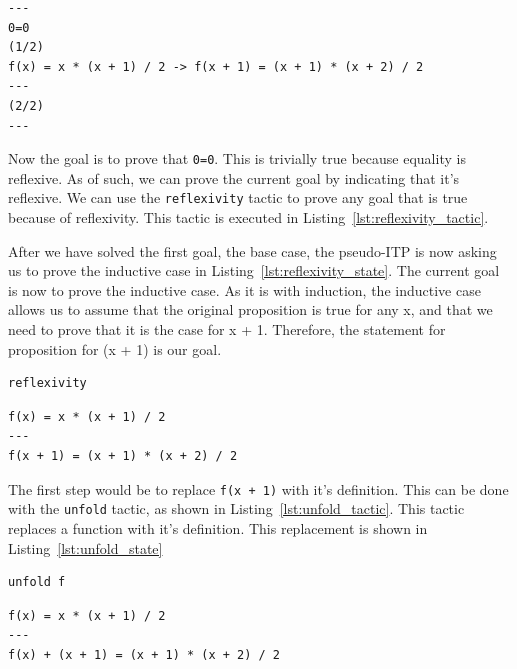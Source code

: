 \documentclass[
]{article}
\newcommand{\passthrough}[1]{#1}
\begin{document}
\begin{lstlisting}[caption={State after running the simplify tactic}, label=lst:simplify_state]
---
0=0
(1/2)
f(x) = x * (x + 1) / 2 -> f(x + 1) = (x + 1) * (x + 2) / 2
---
(2/2)
---
\end{lstlisting}

Now the goal is to prove that \passthrough{\lstinline!0=0!}. This is
trivially true because equality is reflexive. As of such, we can prove
the current goal by indicating that it's reflexive. We can use the
\passthrough{\lstinline!reflexivity!} tactic to prove any goal that is
true because of reflexivity. This tactic is executed in
Listing~\ref{lst:reflexivity_tactic}.

After we have solved the first goal, the base case, the pseudo-ITP is
now asking us to prove the inductive case in
Listing~\ref{lst:reflexivity_state}. The current goal is now to prove
the inductive case. As it is with induction, the inductive case allows
us to assume that the original proposition is true for any x, and that
we need to prove that it is the case for x + 1. Therefore, the statement
for proposition for (x + 1) is our goal.

\begin{lstlisting}[caption={Running the reflexivity tactic}, label=lst:reflexivity_tactic]
reflexivity
\end{lstlisting}

\begin{lstlisting}[caption={State after running the reflexivity tactic}, label=lst:reflexivity_state]
f(x) = x * (x + 1) / 2
---
f(x + 1) = (x + 1) * (x + 2) / 2
\end{lstlisting}

The first step would be to replace \passthrough{\lstinline!f(x + 1)!}
with it's definition. This can be done with the
\passthrough{\lstinline!unfold!} tactic, as shown in
Listing~\ref{lst:unfold_tactic}. This tactic replaces a function with
it's definition. This replacement is shown in
Listing~\ref{lst:unfold_state}

\begin{lstlisting}[caption={Running the unfold tactic}, label=lst:unfold_tactic]
unfold f
\end{lstlisting}

\begin{lstlisting}[caption={State after running the reflexivity tactic}, label=lst:unfold_state]
f(x) = x * (x + 1) / 2
---
f(x) + (x + 1) = (x + 1) * (x + 2) / 2
\end{lstlisting}
\end{document}
